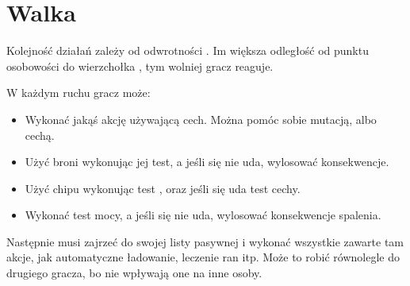\chapter{Walka}
Kolejność działań zależy od odwrotności \abp.
Im większa odległość od punktu osobowości do wierzchołka \abp, tym wolniej gracz reaguje.

W każdym ruchu gracz może:
\begin{itemize}
\item Wykonać jakąś akcję używającą cech. Można pomóc sobie mutacją, albo cechą.
\item Użyć broni wykonując jej test, a jeśli się nie uda, wylosować konsekwencje.
\item Użyć chipu wykonując test \abnkp, oraz jeśli się uda test cechy.
\item Wykonać test mocy, a jeśli się nie uda, wylosować konsekwencje spalenia.
\end{itemize}

Następnie musi zajrzeć do swojej listy pasywnej i wykonać wszystkie zawarte tam akcje, jak automatyczne ładowanie, leczenie ran itp.
Może to robić równolegle do drugiego gracza, bo nie wpływają one na inne osoby.


